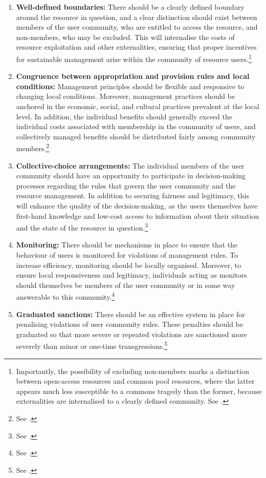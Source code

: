 \begin{enumerate}
\item {\bf Well-defined boundaries:} There should be a clearly defined boundary around the resource in question, and a clear distinction should exist between members of the user community, who are entitled to access the resource, and non-members, who may be excluded. This will internalise the costs of resource exploitation and other externalities, ensuring that proper incentives for sustainable management arise within the community of resource users.\footnote{Importantly, the possibility of excluding non-members marks a distinction between open-access resources and common pool resources, where the latter appears much less susceptible to a commons tragedy than the former, because externalities are internalised to a clearly defined community. See \cite[91-92]{ostrom99}.}
\item {\bf Congruence between appropriation and provision rules and local conditions:} Management principles should be flexible and responsive to changing local conditions. Moreover, management practices should be anchored in the economic, social, and cultural practices prevalent at the local level. In addition, the individual benefits should generally exceed the individual costs associated with membership in the community of users, and collectively managed benefits should be distributed fairly among community members.\footnote{See \cite[92]{ostrom90}.}
\item {\bf Collective-choice arrangements:} The individual members of the user community should have an opportunity to participate in decision-making processes regarding the rules that govern the user community and the resource management. In addition to securing fairness and legitimacy, this will enhance the quality of the decision-making, as the users themselves have first-hand knowledge and low-cost access to information about their situation and the state of the resource in question.\footnote{See \cite[93]{ostrom90}.}
\item {\bf Monitoring:} There should be mechanisms in place to ensure that the behaviour of users is monitored for violations of management rules. To increase efficiency, monitoring should be locally organised. Moreover, to ensure local responsiveness and legitimacy, individuals acting as monitors should themselves be members of the user community or in some way answerable to this community.\footnote{See \cite[94-100]{ostrom90}.}
\item {\bf Graduated sanctions:} There should be an effective system in place for penalising violations of user community rules. These penalties should be graduated so that more severe or repeated violations are sanctioned more severely than minor or one-time transgressions.\footnote{See \cite[94-100]{ostrom90}.}

\end{enumerate}
